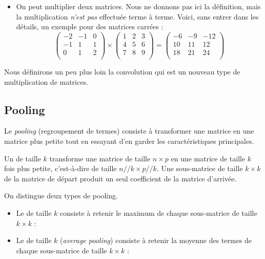 \documentclass[11pt,class=report,crop=false]{standalone}
\begin{document}
\begin{itemize}
  
  \item {} On peut multiplier deux matrices. Nous ne donnons pas ici la définition, mais la multiplication \emph{n'est pas} effectuée terme à terme. Voici, sans entrer dans les détails, un exemple pour des matrices carrées :
  $$\begin{pmatrix}
  -2&-1&0\\
  -1&1&1\\
   0&1&2\\
  \end{pmatrix} 
    \times 
    \begin{pmatrix}
      1&2&3\\
      4&5&6\\
      7&8&9\\
      \end{pmatrix}
     =
    \begin{pmatrix}
      -6&-9&-12\\
      10&11&12\\
      18&21&24\\
      \end{pmatrix}    
    $$
\end{itemize}

Nous définirons un peu plus loin la convolution qui est un nouveau type de multiplication de matrices.

\subsection{Pooling}

Le \emph{pooling} (regroupement de termes) consiste à transformer une matrice en une matrice plus petite tout en essayant d'en garder les caractéristiques principales.

Un  de taille $k$ transforme une matrice de taille $n \times p$ en une matrice de taille $k$ fois plus petite, c'est-à-dire de taille $n//k \times p//k$.
Une sous-matrice de taille $k\times k$ de la matrice de départ produit un seul coefficient de la matrice d'arrivée.



On distingue deux types de pooling.
\begin{itemize}
  \item Le  de taille $k$ consiste à retenir le maximum de chaque sous-matrice de taille $k\times k$ :
  
  
  
  \item Le  de taille $k$ (\emph{average pooling}) consiste  à retenir la moyenne des termes de chaque sous-matrice de taille $k\times k$ :
  
  
\end{itemize}
\end{document}
